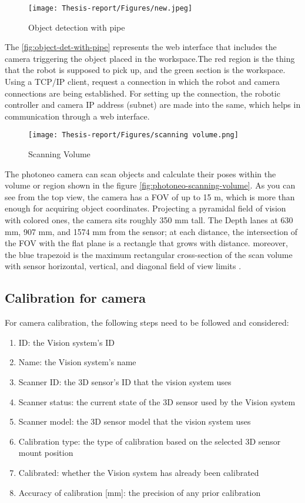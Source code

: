 \documentclass[12pt]{article}
\begin{document}
\begin{figure}[h]
    \centering
    \texttt{[image: Thesis-report/Figures/new.jpeg]}
    \caption{Object detection with pipe }
    \label{fig:object-det-with-pipe}
\end{figure}

 The \autoref{fig:object-det-with-pipe} represents the web interface that includes the camera triggering the object placed in the workspace.The red region is the thing that the robot is supposed to pick up, and the green section is the workspace. Using a TCP/IP client, request a connection in which the robot and camera connections are being established. For setting up the connection, the robotic controller and camera IP address (subnet) are made into the same, which helps in communication through a web interface.
 
\begin{figure}[h]
  \centering
  \texttt{[image: Thesis-report/Figures/scanning volume.png]}
  \caption{Scanning Volume \cite{ref18}}
  \label{fig:photoneo-scanning-volume}
\end{figure}

The photoneo camera can scan objects and calculate their poses within the volume or region shown in the figure \autoref{fig:photoneo-scanning-volume}.  As you can see from the top view, the camera has a FOV of up to 15 m, which is more than enough for acquiring object coordinates.  Projecting a pyramidal field of vision with colored ones, the camera sits roughly 350 mm tall. The Depth lanes at 630 mm, 907 mm, and 1574 mm from the sensor; at each distance, the intersection of the FOV with the flat plane is a rectangle that grows with distance. moreover, the blue trapezoid is the maximum rectangular cross-section of the scan volume with sensor horizontal, vertical, and diagonal field of view limits \cite{ref2}.


\subsection{Calibration for camera}

For camera calibration, the following steps need to be followed and considered: \cite{ref2}
\begin{enumerate}
    \item  ID: the Vision system's ID 
    \item  Name: the Vision system's name 
    \item  Scanner ID: the 3D sensor's ID that the vision system uses 
    \item  Scanner status: the current state of the 3D sensor used by the Vision system
    \item  Scanner model: the 3D sensor model that the vision system uses 
    \item  Calibration type: the type of calibration based on the selected 3D sensor mount position 
    \item  Calibrated: whether the Vision system has already been calibrated 
    \item  Accuracy of calibration [mm]: the precision of any prior calibration 
\end{enumerate}
\end{document}
